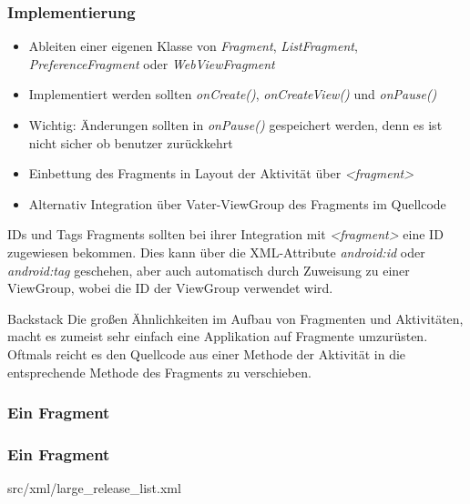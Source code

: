 \begin{frame}[label=fragment_implementation]
   \frametitle{Implementierung}
   \begin{itemize}
      \item Ableiten einer eigenen Klasse von \emph{Fragment}, \emph{ListFragment}, 
      	\emph{PreferenceFragment} oder \emph{WebViewFragment}
      \item Implementiert werden sollten \emph{onCreate()}, 
			\emph{onCreateView()} und \emph{onPause()}
      \item Wichtig: Änderungen sollten in \emph{onPause()} gespeichert werden, 
      	denn es ist nicht sicher ob benutzer zurückkehrt
      \item Einbettung des Fragments in Layout der Aktivität über 
      	\emph{\textless{}fragment\textgreater}
      \item Alternativ Integration über Vater-ViewGroup des Fragments 
      	im Quellcode
   \end{itemize}

   \begin{alertblock}{IDs und Tags}
		Fragments sollten bei ihrer Integration mit \emph{\textless{}fragment\textgreater} 
		eine ID zugewiesen bekommen. Dies kann über die XML-Attribute \emph{android:id} oder 
		\emph{android:tag} geschehen, aber auch automatisch durch Zuweisung zu einer ViewGroup, 
		wobei die ID der ViewGroup verwendet wird.\\
   \end{alertblock}
   
   \begin{alertblock}{Backstack}
		Die großen Ähnlichkeiten im Aufbau von Fragmenten und Aktivitäten, macht es 
		zumeist sehr einfach eine Applikation auf Fragmente umzurüsten. 
		Oftmals reicht es den Quellcode aus einer Methode der Aktivität in die 
		entsprechende Methode des Fragments zu verschieben.
   \end{alertblock}
\end{frame}

\begin{frame}[label=first_fragment]
   \frametitle{Ein Fragment}
	
\end{frame}

\begin{frame}[label=include_layout_fragment]
   \frametitle{Ein Fragment}
	
		{src/xml/large_release_list.xml}
\end{frame}

